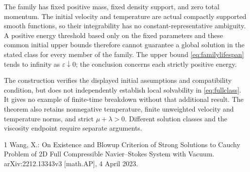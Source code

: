 \documentclass[11pt,letterpaper]{article}
\numberwithin{equation}{section}
\theoremstyle{definition}
\begin{document}
The family has fixed positive mass, fixed density support, and zero
total momentum. The initial velocity and temperature are actual
compactly supported smooth functions, so their integrability has no
constant-representative ambiguity. A positive energy threshold based
only on the fixed parameters and these common initial upper bounds
therefore cannot guarantee a global solution in the stated class for
every member of the family. The upper bound
\eqref{eq:familylifespan} tends to infinity as
$\varepsilon\downarrow0$; the conclusion concerns each strictly
positive energy.

The construction verifies the displayed initial assumptions and
compatibility condition, but does not independently establish local
solvability in \eqref{eq:fullclass}. It gives no example of finite-time
breakdown without that additional result. The theorem also retains
nonnegative temperature, finite unweighted velocity and temperature
norms, and strict $\mu+\lambda>0$. Different solution classes and the
viscosity endpoint require separate arguments.

\begin{thebibliography}{1}
Wang, X.:
On Existence and Blowup Criterion of Strong Solutions to
Cauchy Problem of 2D Full Compressible Navier--Stokes System with Vacuum.
arXiv:2212.13343v3 [math.AP], 4 April 2023.
\end{thebibliography}
\end{document}
